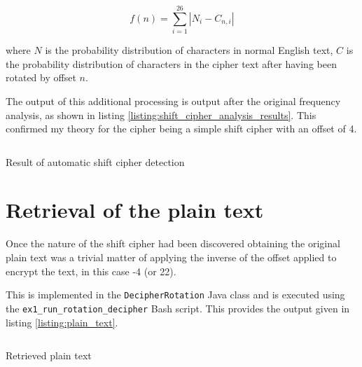 \documentclass[a4paper]{article}
\begin{document}
\begin{equation}
  f(n) = \sum_{i = 1}^{26} |N_{i} - C_{n, i}|
  \label{eq:offset_goal_function}
\end{equation}

where $N$ is the probability distribution of characters in normal English text,
$C$ is the probability distribution of characters in the cipher text after
having been rotated by offset $n$.

The output of this additional processing is output after the original frequency
analysis, as shown in listing \ref{listing:shift_cipher_analysis_results}. This
confirmed my theory for the cipher being a simple shift cipher with an offset of
4.

\begin{listing}
  \inputminted[frame=lines,fontsize=\scriptsize]{text}{listings/ex1_cryptanalysis_2.txt}
  \caption{Result of automatic shift cipher detection}
  \label{listing:shift_cipher_analysis_results}
\end{listing}

\section{Retrieval of the plain text}

Once the nature of the shift cipher had been discovered obtaining the original
plain text was a trivial matter of applying the inverse of the offset applied to
encrypt the text, in this case -4 (or 22).

This is implemented in the \texttt{DecipherRotation} Java class and is executed
using the \texttt{ex1\_run\_rotation\_decipher} Bash script. This provides the
output given in listing \ref{listing:plain_text}.

\begin{listing}
  \inputminted[frame=lines,fontsize=\scriptsize]{text}{../coursework1_implementation/src/test/resources/Exercise1Plaintext.txt}
  \caption{Retrieved plain text}
  \label{listing:plain_text}
\end{listing}



\printbibliography
\end{document}

